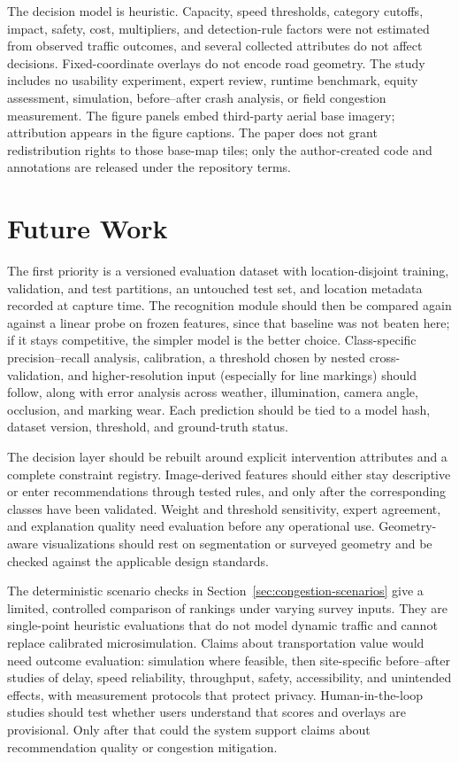 \documentclass[11pt]{article}
\begin{document}
The decision model is heuristic. Capacity, speed thresholds, category cutoffs, impact, safety, cost, multipliers, and detection-rule factors were not estimated from observed traffic outcomes, and several collected attributes do not affect decisions. Fixed-coordinate overlays do not encode road geometry. The study includes no usability experiment, expert review, runtime benchmark, equity assessment, simulation, before--after crash analysis, or field congestion measurement. The figure panels embed third-party aerial base imagery; attribution appears in the figure captions. The paper does not grant redistribution rights to those base-map tiles; only the author-created code and annotations are released under the repository terms.

\section{Future Work}
The first priority is a versioned evaluation dataset with location-disjoint training, validation, and test partitions, an untouched test set, and location metadata recorded at capture time. The recognition module should then be compared again against a linear probe on frozen features, since that baseline was not beaten here; if it stays competitive, the simpler model is the better choice. Class-specific precision--recall analysis, calibration, a threshold chosen by nested cross-validation, and higher-resolution input (especially for line markings) should follow, along with error analysis across weather, illumination, camera angle, occlusion, and marking wear. Each prediction should be tied to a model hash, dataset version, threshold, and ground-truth status.

The decision layer should be rebuilt around explicit intervention attributes and a complete constraint registry. Image-derived features should either stay descriptive or enter recommendations through tested rules, and only after the corresponding classes have been validated. Weight and threshold sensitivity, expert agreement, and explanation quality need evaluation before any operational use. Geometry-aware visualizations should rest on segmentation or surveyed geometry and be checked against the applicable design standards.

The deterministic scenario checks in Section~\ref{sec:congestion-scenarios} give a limited, controlled comparison of rankings under varying survey inputs. They are single-point heuristic evaluations that do not model dynamic traffic and cannot replace calibrated microsimulation. Claims about transportation value would need outcome evaluation: simulation where feasible, then site-specific before--after studies of delay, speed reliability, throughput, safety, accessibility, and unintended effects, with measurement protocols that protect privacy. Human-in-the-loop studies should test whether users understand that scores and overlays are provisional. Only after that could the system support claims about recommendation quality or congestion mitigation.
\end{document}

